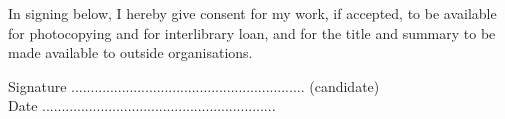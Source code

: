 In signing below, I hereby give consent for my work, if accepted, to be available for photocopying and for interlibrary loan, and for the title and summary to be made available to outside organisations.  

\vspace{3em}
Signature ............................................................ (candidate)  \\

\vspace{1em}
Date ............................................................ \\
